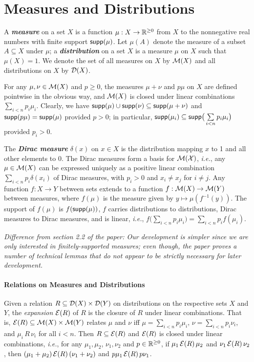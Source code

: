 \documentclass[10pt]{article}
\begin{document}
\section{Measures and Distributions}

A \textbf{\emph{measure}} on a set $X$ is a function $\mu : X \to \mathbb{R}^{\geq 0}$ from $X$ to the nonnegative real numbers with finite support $\mathsf{supp}(\mu)$. Let $\mu(A)$ denote the measure of a subset $A \subseteq X$ under $\mu$; a \textbf{\emph{distribution}} on a set $X$ is a measure $\mu$ on $X$ such that $\mu(X) = 1$. We denote the set of all measures on $X$ by $\mathcal{M}(X)$ and all distributions on $X$ by $\mathcal{D}(X)$. 

For any $\mu, \nu \in \mathcal{M}(X)$ and $p \geq 0$, the measures $\mu + \nu$ and $p \mu$ on $X$ are defined pointwise in the obvious way, and $\mathcal{M}(X)$ is closed under linear combinations $\sum\limits_{i < n} p_i \mu_i$. Clearly, we have $\mathsf{supp}(\mu) \cup \mathsf{supp}(\nu) \subseteq \mathsf{supp}(\mu + \nu)$ and $\mathsf{supp}(p \mu) = \mathsf{supp}(\mu)$ provided $p > 0$; in particular, $\mathsf{supp}(\mu_i) \subseteq \mathsf{supp}\big(\sum\limits_{i < n} p_i \mu_i\big)$ provided $p_i > 0$.

The \textbf{\emph{Dirac measure}} $\delta(x)$ on $x \in X$ is the distribution mapping $x$ to 1 and all other elements to 0. The Dirac measures form a basis for $\mathcal{M}(\mathcal{X})$, \emph{i.e.}, any $\mu \in \mathcal{M}(X)$ can be expressed uniquely as a positive linear combination $\sum\limits_{i < n} p_i \delta(x_i)$ of Dirac measures, with $p_i > 0$ and $x_i \neq x_j$ for $i \neq j$. Any function $f : X \to Y$ between sets extends to a function $f : \mathcal{M}(X) \to \mathcal{M}(Y)$ between measures, where $f(\mu)$ is the measure given by $y \mapsto \mu(f^{-1}(y))$. The support of $f(\mu)$ is $f(\mathsf{supp}(\mu))$, $f$ carries distributions to distributions, Dirac measures to Dirac measures, and is linear, \emph{i.e.}, $f \big(\sum\limits_{i < n} p_i \mu_i \big) = \sum\limits_{i < n} p_i f(\mu_i)$. \medskip

{\small \em Difference from section 2.2 of the paper: Our development is simpler since we are only interested in finitely-supported measures; even though, the paper proves a number of technical lemmas that do not appear to be strictly necessary for later development.}  

\paragraph{Relations on Measures and Distributions}
Given a relation $R \subseteq \mathcal{D}(X) \times \mathcal{D}(Y)$ on distributions on the respective sets $X$ and $Y$, the \textit{\emph{expansion}} $\mathcal{E}(R)$ of $R$ is the closure of $R$ under linear combinations. That is, $\mathcal{E}(R) \subseteq \mathcal{M}(X) \times \mathcal{M}(Y)$ relates $\mu$ and $\nu$ iff $\mu = \sum\limits_{i < n} p_i \mu_i$, $\nu = \sum\limits_{i < n} p_i \nu_i$, and $\mu_i \, R \, \nu_i$ for all $i < n$. Then $R \subseteq \mathcal{E}(R)$ and $\mathcal{E}(R)$ is closed under linear combinations, \emph{i.e.}, for any $\mu_1,\mu_2$, $\nu_1,\nu_2$ and $p \in \mathbb{R}^{\geq 0}$, if $\mu_1 \, \mathcal{E}(R) \, \mu_2$ and $\nu_1 \, \mathcal{E}(R) \, \nu_2$, then $(\mu_1 + \mu_2)\, \mathcal{E}(R) \, (\nu_1 + \nu_2)$ and $p \mu_1 \, \mathcal{E}(R) \, p \nu_1$.  
\end{document}
